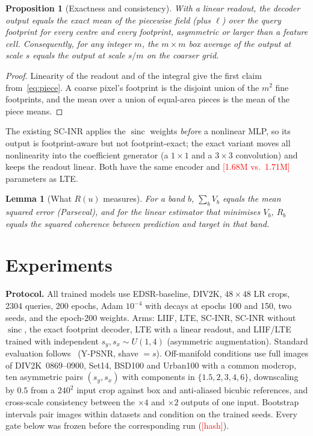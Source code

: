 \documentclass[conference]{IEEEtran}
\newcommand{\todo}[1]{\textcolor{red}{[#1]}}
\newtheorem{proposition}{Proposition}
\newtheorem{lemma}{Lemma}
\newcommand{\sinc}{\operatorname{sinc}}
\begin{document}
\begin{proposition}[Exactness and consistency]\label{prop:exact}
With a linear readout, the decoder output equals the exact mean of the piecewise field (plus $\ell$) over the query footprint for every centre and every footprint, asymmetric or larger than a feature cell. Consequently, for any integer $m$, the $m{\times}m$ box average of the output at scale $s$ equals the output at scale $s/m$ on the coarser grid.
\end{proposition}
\begin{proof}
Linearity of the readout and of the integral give the first claim from~\eqref{eq:piece}. A coarse pixel's footprint is the disjoint union of the $m^2$ fine footprints, and the mean over a union of equal-area pieces is the mean of the piece means.
\end{proof}
The existing SC-INR applies the $\sinc$ weights \emph{before} a nonlinear MLP, so its output is footprint-aware but not footprint-exact; the exact variant moves all nonlinearity into the coefficient generator (a $1{\times}1$ and a $3{\times}3$ convolution) and keeps the readout linear. Both have the same encoder and \todo{1.68M vs.\ 1.71M} parameters as LTE.

\begin{lemma}[What $R(u)$ measures]\label{lem:ru}
For a band $b$, $\sum_b V_b$ equals the mean squared error (Parseval), and for the linear estimator that minimises $V_b$, $R_b$ equals the squared coherence between prediction and target in that band.
\end{lemma}

\section{Experiments}
\label{sec:exp}
\textbf{Protocol.} All trained models use EDSR-baseline, DIV2K, $48{\times}48$ LR crops, 2304 queries, 200 epochs, Adam $10^{-4}$ with decays at epochs 100 and 150, two seeds, and the epoch-200 weights. Arms: LIIF, LTE, SC-INR, SC-INR without $\sinc$, the exact footprint decoder, LTE with a linear readout, and LIIF/LTE trained with independent $s_y,s_x\sim U(1,4)$ (asymmetric augmentation). Standard evaluation follows~\cite{chen2021liif} (Y-PSNR, shave $=s$). Off-manifold conditions use full images of DIV2K~0869--0900, Set14, BSD100 and Urban100 with a common modcrop, ten asymmetric pairs $(s_y,s_x)$ with components in $\{1.5,2,3,4,6\}$, downscaling by $0.5$ from a $240^2$ input crop against box and anti-aliased bicubic references, and cross-scale consistency between the $\times4$ and $\times2$ outputs of one input. Bootstrap intervals pair images within datasets and condition on the trained seeds. Every gate below was frozen before the corresponding run (\todo{hash}).
\end{document}
